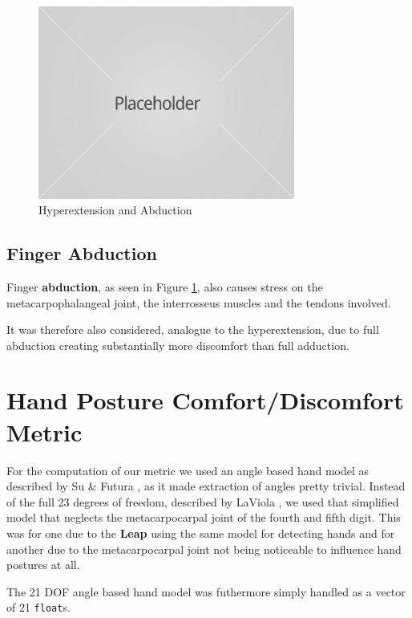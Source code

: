 \documentclass{sig-alternate-05-2015}
\begin{document}
\begin{figure}
\centering
\includegraphics[width=8.45cm]{placeholder1}
\vspace{-20pt}
\caption{Hyperextension and Abduction}
\label{fig:hyperabduction}
\vspace{-10pt}
\end{figure}

\subsection{Finger Abduction}

Finger \textbf{abduction}, as seen in Figure \ref{fig:hyperabduction}, 
also causes stress on the metacarpophalangeal joint, the interrosseus muscles and the tendons involved.

It was therefore also considered, analogue to the hyperextension, due to full abduction creating substantially more discomfort than full adduction.


\section{Hand Posture Comfort/Discomfort Metric}
For the computation of our metric we used an angle based hand model as described by Su \& Futura \cite{su1994logical}, as it made extraction of angles pretty trivial. Instead of the full 23 degrees of freedom, described by LaViola \cite{laviola1999survey}, we used that simplified model that neglects the metacarpocarpal joint of the fourth and fifth digit. This was for one due to the \textbf{Leap} using the same model for detecting hands and for another due to the metacarpocarpal joint not being noticeable to influence hand postures at all.

The 21 DOF angle based hand model was futhermore simply handled as a vector of 21 \texttt{float}s. 
\end{document}
